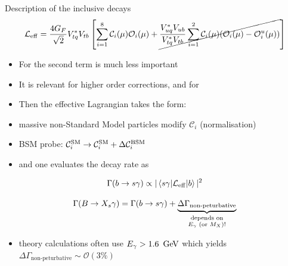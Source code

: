 \documentclass[xcolor=dvipsnames]{beamer}
\begin{document}
\begin{frame}{Description of the inclusive \BtoXsgamma decays}
   \scriptsize
      \begin{equation}\nonumber
         \mathcal{L}_{\mathrm{eff}} = \frac{4G_F}{\sqrt{2}}V_{tq}^*V_{tb}\left[\sum^{8}_{i=1}\mathcal{C}_i(\mu)\mathcal{O}_i(\mu)
                                                     + \cancel{\frac{V^*_{uq}V_{ub}}{V^*_{tq}V_{tb}}\sum^{2}_{i=1}\mathcal{C}_i(\mu)(\mathcal{O}_i(\mu)-\mathcal{O}_i^u(\mu))}\right]
      \end{equation}
   
   \begin{itemize}
      \item For \btosgamma the second term is much less important
      \item It is relevant for higher order corrections, and for \btodgamma
      \item[\ra] Then the effective Lagrangian takes the form:
   \end{itemize}
   
   \vspace{-0pt}
   
   
   
   \begin{itemize}
      \item[\ra] massive non-Standard Model particles modify $\mathcal{C}_i$ (normalisation)
      \item[\ra] BSM probe: $      \mathcal{C}_i^{\mathrm{SM}} \rightarrow \mathcal{C}_i^{\mathrm{SM}} + \Delta\mathcal{C}_i^{\mathrm{BSM}}$
      \item and one evaluates the decay rate as 
   \end{itemize}
   
   \vspace{-10pt}
   
   
   \begin{equation}\nonumber
      \Gamma({b\rightarrow s\gamma})\propto|\mel**{s\gamma}{\mathcal{L}_{\mathrm{eff}}}{b}|^2
   \end{equation}   

   \begin{equation}\nonumber
      \Gamma(B\ra\X_s\g) = \Gamma(b\ra s\g) + \underbrace{\Delta\Gamma_{\text{non-peturbative}}}_{\substack{\text{depends on}\\ \text{\Egamma (or }M_X\text{)!}}}
  \end{equation}

  \begin{itemize}
   \item theory calculations often use ${E_{\gamma}} > 1.6~\mathrm{\,Ge\kern -0.1em V}$  which yields $\Delta\Gamma_{\text{non-peturbative}} \sim \mathcal{O}(3\%)$
  \end{itemize}
  
\end{frame}
\end{document}
